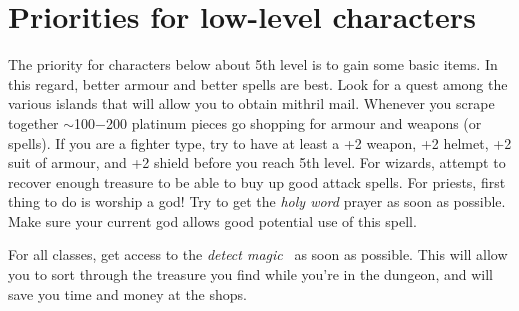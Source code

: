 \section{Priorities for low-level characters}\label{sec:low}

The priority for characters below about 5th level is to gain some 
basic items. In this regard, better armour and better spells are best. 
Look for a 
quest among the various islands that will allow you to obtain
mithril mail. Whenever you scrape together $\sim$100$-$200 platinum
pieces go shopping for armour and weapons (or spells). If you are a 
fighter type, try to have at least a +2
weapon, +2 helmet, +2 suit of armour, and +2 shield before you reach 5th level.
For wizards, attempt to recover enough treasure to be able to buy
up good attack spells. For priests, first thing to do is worship a god!
Try to get the {\em holy word} prayer as soon as possible. Make sure 
your current god allows good potential use of this spell.

For all classes, get access to the {\em detect magic} \incantation\ 
as soon as possible. 
This will allow you to sort through the treasure you find while you're in 
the dungeon, and will save you time and money at the shops.
